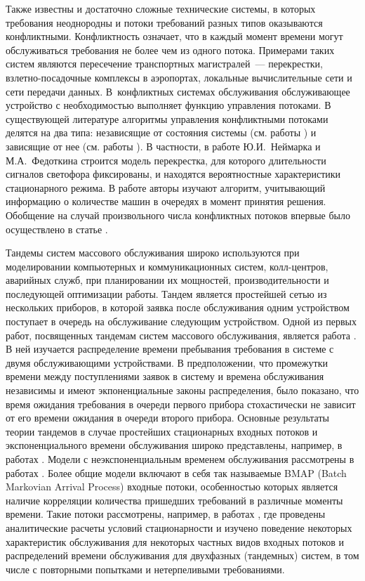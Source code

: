 Также известны и достаточно сложные технические системы, в которых требования неоднородны и потоки требований разных типов оказываются конфликтными. Конфликтность означает, что в каждый момент времени могут обслуживаться требования не более чем из одного потока. Примерами таких систем являются пересечение транспортных магистралей~--- перекрестки, взлетно-посадочные комплексы в аэропортах, локальные вычислительные сети и сети передачи данных. В~конфликтных системах обслуживания обслуживающее устройство с необходимостью выполняет функцию управления потоками. В существующей литературе алгоритмы управления конфликтными потоками делятся на два типа: независящие от состояния системы (см. работы \cite{Darroch:1964,Neimark:1966}) и зависящие от нее  (см. работы \cite{Neimark:1968, Fedotkin:1976, Ferguson:1985, Takagi:1985}). В частности, в работе Ю.И.~Неймарка и М.А.~Федоткина \cite{Neimark:1966} строится модель перекрестка, для которого длительности сигналов светофора фиксированы, и находятся вероятностные характеристики стационарного режима. В работе \cite{Neimark:1968} авторы изучают алгоритм, учитывающий информацию о количестве машин в очередях в момент принятия решения. Обобщение на случай произвольного числа конфликтных потоков впервые было осуществлено в статье \cite{Yakushev:1990}.

 
  
Тандемы систем массового обслуживания широко используются при моделировании компьютерных и коммуникационных систем, колл-центров, аварийных служб, при планировании их мощностей, производительности и последующей оптимизации работы. 
Тандем является простейшей сетью из нескольких приборов, в которой заявка после обслуживания одним устройством  поступает в очередь на обслуживание следующим устройством.
Одной из первых работ, посвященных тандемам систем массового обслуживания, является работа \cite{reich}. В ней изучается распределение времени пребывания требования в системе с двумя обслуживающими устройствами. В предположении, что промежутки времени между поступлениями заявок в систему и времена обслуживания независимы и имеют экпоненциальные законы распределения, было показано, что время ожидания требования в очереди первого прибора стохастически не зависит от его времени ожидания в очереди второго прибора. Основные результаты теории тандемов в случае простейших стационарных входных потоков и экспоненциального времени обслуживания широко представлены, например, в работах \cite{Balsamo, GnedenkoKonig}. Модели с неэкспоненциальным временем обслуживания рассмотрены в работах \cite{Gomez:1,Gomez:2,Gomez:3}. Более общие модели включают в себя так называемые BMAP (Batch Markovian Arrival Process) входные потоки, особенностью которых является наличие корреляции количества пришедших требований в различные моменты времени. Такие потоки рассмотрены, например, в работах \cite{KlimenokDudin:2005,KlimenokDudin:2004,Klimenok:2010,Klimenok:2011,Klimenok:2015 }, где проведены аналитические расчеты условий стационарности и изучено поведение некоторых характеристик обслуживания для некоторых частных видов входных потоков и распределений времени обслуживания для двухфазных (тандемных) систем, в том числе с повторными попытками и нетерпеливыми требованиями.  

